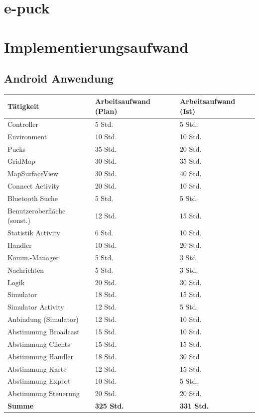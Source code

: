 \documentclass[10pt,a4paper]{article}
\begin{document}
	\section{e-puck}
	
	\section{Implementierungsaufwand}
		\subsection{Android Anwendung}
		\begin{tabular}{|l|l|l|}
			\hline \textbf{Tätigkeit} & \textbf{Arbeitsaufwand} (Plan) & \textbf{Arbeitsaufwand} (Ist) \\ 
			\hline Controller & 5 Std. & 5 Std. \\ 
			\hline Environment & 10 Std. & 10 Std. \\ 
			\hline Pucks & 35 Std. & 20 Std. \\ 
			\hline GridMap & 30 Std. & 35 Std. \\ 
			\hline MapSurfaceView & 30 Std. & 40 Std. \\ 
			\hline Connect Activity & 20 Std. & 10 Std. \\ 
			\hline Bluetooth Suche & 5 Std. & 5 Std. \\ 
			\hline Benutzeroberfläche (sonst.) & 12 Std. & 15 Std. \\ 
			\hline Statistik Activity & 6 Std. & 10 Std. \\ 
			\hline Handler & 10 Std. & 20 Std. \\ 
			\hline Komm.-Manager & 5 Std. & 3 Std. \\ 
			\hline Nachrichten & 5 Std. & 3 Std. \\ 
			\hline Logik & 20 Std. & 30 Std. \\ 
			\hline Simulator & 18 Std. & 15 Std. \\ 
			\hline Simulator Activity & 12 Std. & 5 Std. \\ 
			\hline Anbindung (Simulator) & 12 Std. & 10 Std. \\ 
			\hline Abstimmung Broadcast & 15 Std. & 10 Std. \\ 
			\hline Abstimmung Clients & 15 Std. & 15 Std. \\ 
			\hline Abstimmung Handler & 18 Std. & 30 Std \\ 
			\hline Abstimmung Karte & 12 Std. & 15 Std. \\ 
			\hline Abstimmung Export & 10 Std. & 5 Std. \\ 
			\hline Abstimmung Steuerung & 20 Std. & 20 Std. \\ 
			\hline \textbf{Summe} & \textbf{325 Std.} & \textbf{331 Std.} \\ 
			\hline 
		\end{tabular} 
		
\end{document}
